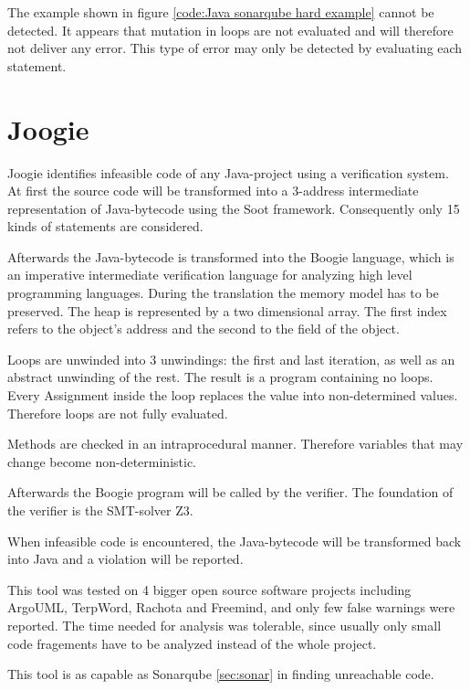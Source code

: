The example shown in figure \ref{code:Java sonarqube hard example} cannot be detected. It appears that mutation in loops are not evaluated and will therefore not deliver any error. This type of error may only be detected by evaluating each statement.

\section{Joogie}
\label{sec:sca paper}
Joogie \cite{arltJoogieInfeasibleCode2012, arltJoogieJavaJimple2013} identifies infeasible code of any Java-project using a verification system. 
At first the source code will be transformed into a 3-address intermediate representation of Java-bytecode using the Soot framework. Consequently only 15 kinds of statements are considered. 

Afterwards the Java-bytecode is transformed into the Boogie language, which is an imperative intermediate verification language for analyzing high level programming languages.
During the translation the memory model has to be preserved. The heap is represented by a two dimensional array. The first index refers to the object's address and the second to the field of the object.

Loops are unwinded into 3 unwindings: the first and last iteration, as well as an abstract unwinding of the rest.
The result is a program containing no loops. Every Assignment inside the loop replaces the value into non-determined values. Therefore loops are not fully evaluated.


Methods are checked in an intraprocedural manner. Therefore variables that may change become non-deterministic. 


Afterwards the Boogie program will be called by the verifier. 
The foundation of the verifier is the SMT-solver Z3.



When infeasible code is encountered, the Java-bytecode will be transformed back into Java and a violation will be reported.


This tool was tested on 4 bigger open source software projects including ArgoUML, TerpWord, Rachota and Freemind, and only few false warnings were reported.
The time needed for analysis was tolerable, since usually only small code fragements have to be analyzed instead of the whole project.

This tool is as capable as Sonarqube \ref{sec:sonar} in finding unreachable code.

